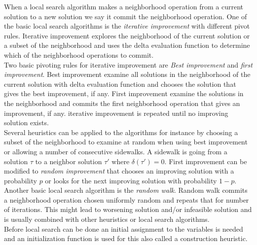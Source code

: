 When a local search algorithm makes a neighborhood operation from a current solution to a new solution we say it 
commit the neighborhood operation. One of the basic local search algorithms is the \emph{iterative 
improvement} with different pivot rules. Iterative improvement explores the neighborhood of the current solution or a 
subset of the neighborhood and uses the delta evaluation function to determine which of the neighborhood operations to 
commit. \\ 
Two basic pivoting rules for iterative improvement are \emph{Best improvement} and \emph{first improvement}. Best 
improvement examine all solutions in the neighborhood of the current solution with delta evaluation function and 
chooses the solution that gives the best improvement, if any. First improvement examine the solutions in the 
neighborhood and commits the first neighborhood operation that gives an improvement, if any. iterative 
improvement is repeated until no improving solution exists. \\ 
Several heuristics can be applied to the algorithms for instance by choosing a subset of the neighborhood to examine at 
random when using best improvement or allowing a number of consecutive sidewalks. A sidewalk is going from a solution 
$\tau$ to a neighbor solution $\tau'$ where $\delta(\tau') = 0$. First improvement can be modified to \emph{random 
improvement} that chooses an improving solution with a probability $p$ or looks for the next improving solution with 
probability $1-p$. \\ 
Another basic local search algorithm is the \emph{random walk}. Random walk commits a neighborhood operation chosen 
uniformly random and repeats that for number of iterations. This might lead to worsening solution and/or infeasible 
solution and is usually combined with other heuristics or local search algorithms. \\
Before local search can be done an initial assignment to the variables is needed and an initialization function is 
used for this also called a construction heuristic. 